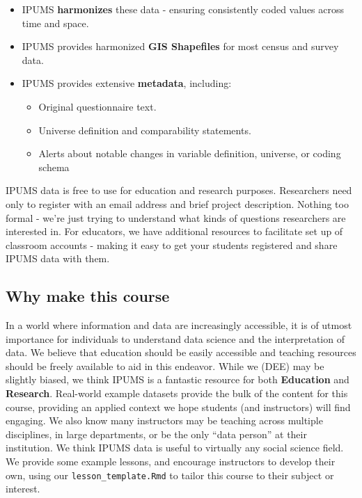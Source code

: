 \documentclass[
]{book}
\providecommand{\tightlist}{%
  \setlength{\itemsep}{0pt}\setlength{\parskip}{0pt}}
\begin{document}
\begin{itemize}
\tightlist
\item
  IPUMS \textbf{harmonizes} these data - ensuring consistently coded values across time and space.
\item
  IPUMS provides harmonized \textbf{GIS Shapefiles} for most census and survey data.
\item
  IPUMS provides extensive \textbf{metadata}, including:

  \begin{itemize}
  \tightlist
  \item
    Original questionnaire text.
  \item
    Universe definition and comparability statements.
  \item
    Alerts about notable changes in variable definition,
    universe, or coding schema
  \end{itemize}
\end{itemize}

IPUMS data is free to use for education and research purposes. Researchers need
only to register with an email address and brief project description. Nothing
too formal - we're just trying to understand what kinds of questions
researchers are interested in. For educators, we have additional resources
to facilitate set up of classroom accounts - making it easy to get your
students registered and share IPUMS data with them.

\hypertarget{why-make-this-course}{%
\subsection*{Why make this course}\label{why-make-this-course}}

In a world where information and data are increasingly accessible, it is of utmost importance for individuals to understand data science and the interpretation of data. We believe that education should be easily accessible and teaching resources should be freely available to aid in this endeavor. While we (DEE) may be slightly biased, we think IPUMS is a fantastic resource for both \textbf{Education} and \textbf{Research}. Real-world example datasets provide the bulk of the content for this course, providing an applied context we hope students (and instructors) will find engaging. We also know many instructors may be teaching across multiple disciplines, in large departments, or be the only ``data person'' at their institution. We think IPUMS data is useful to virtually any social science field. We provide some example lessons, and encourage instructors to develop their own, using our \texttt{lesson\_template.Rmd} to tailor this course to their subject or interest.
\end{document}
